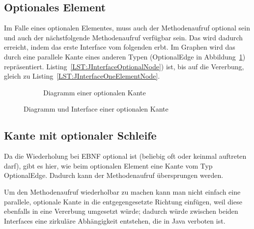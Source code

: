 \documentclass[../InterneDSLs.tex]{subfiles}
\begin{document}
\subsection{Optionales Element}
Im Falle eines optionalen Elementes, muss auch der Methodenaufruf optional sein und auch der nächstfolgende Methodenaufruf verfügbar sein. Das wird dadurch erreicht, indem das erste Interface vom folgenden erbt. Im Graphen wird das durch eine parallele Kante eines anderen Typen (OptionalEdge in Abbildung~\ref{FIG:DiagramOptionalNode}) repräsentiert. Listing~\ref{LST:JInterfaceOptionalNode}) ist, bis auf die Vererbung, gleich zu Listing~\ref{LST:JInterfaceOneElementNode}.
\begin{figure}[ht]
\centering
  \begin{subfigure}[c]{0.49\textwidth}
    \caption{Diagramm einer optionalen Kante}
    \label{FIG:DiagramOptionalNode}
  \end{subfigure}
  \begin{subfigure}[c]{0.49\textwidth}
    
  \end{subfigure}
  \caption{Diagramm und Interface einer optionalen Kante}
  \label{FIG:OptionalNode}
\end{figure}

\subsection{Kante mit optionaler Schleife}
Da die Wiederholung bei EBNF optional ist (beliebig oft oder keinmal auftreten darf), gibt es hier, wie beim optionalen Element eine Kante vom Typ OptionalEdge. Dadurch kann der Methodenaufruf übersprungen werden.

Um den Methodenaufruf wiederholbar zu machen kann man nicht einfach eine parallele, optionale Kante in die entgegengesetzte Richtung einfügen, weil diese ebenfalls in eine Vererbung umgesetzt würde; dadurch würde zwischen beiden Interfaces eine zirkuläre Abhängigkeit entstehen, die in Java verboten ist.
\end{document}
